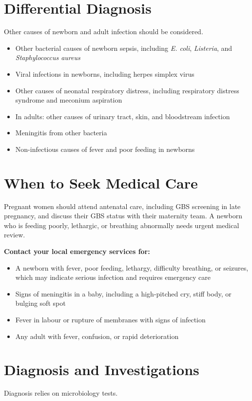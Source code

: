 \section*{Differential Diagnosis}
Other causes of newborn and adult infection should be considered.

\begin{itemize}
    \item Other bacterial causes of newborn sepsis, including \textit{E. coli}, \textit{Listeria}, and \textit{Staphylococcus aureus}
    \item Viral infections in newborns, including herpes simplex virus
    \item Other causes of neonatal respiratory distress, including respiratory distress syndrome and meconium aspiration
    \item In adults: other causes of urinary tract, skin, and bloodstream infection
    \item Meningitis from other bacteria
    \item Non-infectious causes of fever and poor feeding in newborns
\end{itemize}

\section*{When to Seek Medical Care}
Pregnant women should attend antenatal care, including GBS screening in late pregnancy, and discuss their GBS status with their maternity team. A newborn who is feeding poorly, lethargic, or breathing abnormally needs urgent medical review.

\textbf{Contact your local emergency services for:}
\begin{itemize}
    \item A newborn with fever, poor feeding, lethargy, difficulty breathing, or seizures, which may indicate serious infection and requires emergency care
    \item Signs of meningitis in a baby, including a high-pitched cry, stiff body, or bulging soft spot
    \item Fever in labour or rupture of membranes with signs of infection
    \item Any adult with fever, confusion, or rapid deterioration
\end{itemize}

\section*{Diagnosis and Investigations}
Diagnosis relies on microbiology tests.

